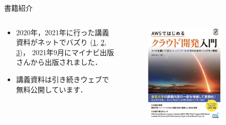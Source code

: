 \documentclass[unicode,11pt]{beamer}
\begin{document}
\begin{frame}{書籍紹介}

\begin{columns}
    \begin{column}{0.47\textwidth}
        \begin{itemize}
            \item 2020年，2021年に行った講義資料がネットでバズり
            (\href{https://b.hatena.ne.jp/entry?url=https\%3A\%2F\%2Ftomomano.github.io\%2Flearn-aws-by-coding\%2F&utm_campaign=bookmark_share&utm_content=tomomano.github.io&utm_medium=social&utm_source=twitter}{1},
            \href{https://twitter.com/developer_quant/status/1465670426676269059?s=20&t=cGWrhgS02UFtiwa_BH95UQ}{2},
            \href{https://twitter.com/shion_honda/status/1281572631544655872?s=20}{3})，
            2021年9月にマイナビ出版さんから出版されました．
            \item 講義資料は引き続きウェブで無料公開しています．
        \end{itemize}
    \end{column}
    \begin{column}{0.5\textwidth}
        \begin{figure}
            \centering
            \includegraphics[width=0.8\textwidth]{cover.png}
        \end{figure}
    \end{column}
\end{columns}

\end{frame}
\end{document}
